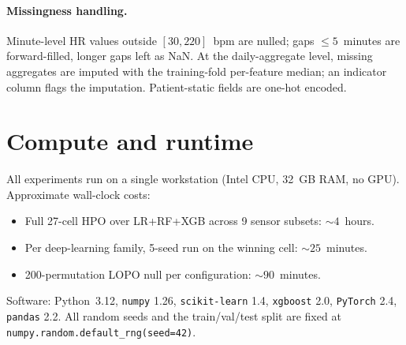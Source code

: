 \documentclass[11pt,a4paper]{article}
\begin{document}
\paragraph{Missingness handling.}
Minute-level HR values outside $[30,220]$~bpm are nulled; gaps
$\leq 5$~minutes are forward-filled, longer gaps left as NaN.  At
the daily-aggregate level, missing aggregates are imputed with the
training-fold per-feature median; an indicator column flags the
imputation.  Patient-static fields are one-hot encoded.

\section{Compute and runtime}\label{app:compute}

All experiments run on a single workstation (Intel CPU, 32~GB RAM,
no GPU).  Approximate wall-clock costs:

\begin{itemize}[nosep,leftmargin=*]
  \item Full 27-cell HPO over LR+RF+XGB across 9 sensor subsets:
        ${\sim}4$~hours.
  \item Per deep-learning family, 5-seed run on the winning cell:
        ${\sim}25$~minutes.
  \item 200-permutation LOPO null per configuration:
        ${\sim}90$~minutes.
\end{itemize}

Software: Python~3.12, \texttt{numpy} 1.26,
\texttt{scikit-learn} 1.4, \texttt{xgboost} 2.0,
\texttt{PyTorch} 2.4, \texttt{pandas} 2.2.  All random seeds and
the train/val/test split are fixed at
\texttt{numpy.random.default\_rng(seed=42)}.
\end{document}
